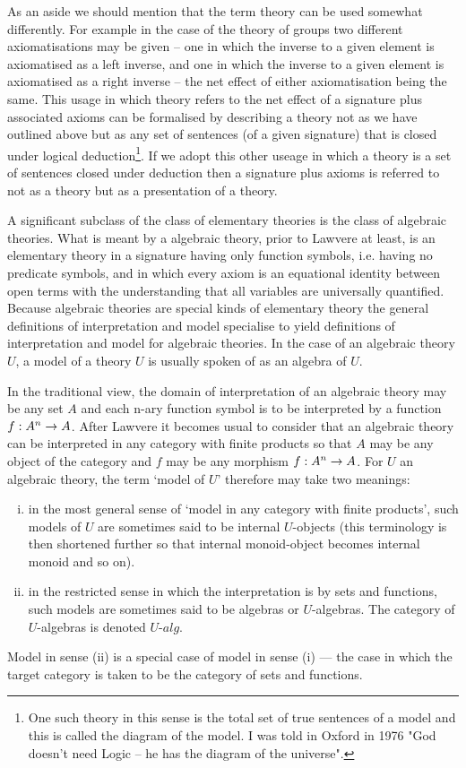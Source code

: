 As an aside we should mention that the term theory can be used somewhat differently. 
For example in the case of the theory of groups two different axiomatisations may be given 
-- one in which the inverse to a given element is axiomatised as a left inverse, and one in which the inverse to a given element is axiomatised as a right inverse --
the net effect of either axiomatisation being the same.
This usage in which  theory refers to the net effect of a signature plus associated axioms
can be formalised by describing a 
theory not as we have outlined above but as any set of sentences
 (of a given signature) that is closed under logical deduction\footnote{One such theory in this sense is the total set of true sentences of a model and  
this is called the diagram of the model. I was told in Oxford in 1976 "God doesn't need Logic -- he has the diagram of the universe".}. 
If we adopt this other useage in which a theory is a set of sentences closed under deduction then a signature plus axioms is referred to not as a theory but as a presentation of a theory. 

A significant subclass of the class of elementary theories is the class of algebraic theories. 
What is meant by a algebraic theory, prior to Lawvere at least, is an elementary theory in a signature having only function symbols, 
i.e. having no predicate symbols, 
and in which every axiom is an equational identity between open terms with the understanding that
all variables are universally quantified. 
Because algebraic theories are special kinds of elementary theory the general definitions of interpretation and model  specialise to yield definitions of 
interpretation and model for algebraic theories. In the case of an algebraic theory $U$, a model of a theory $U$ is usually spoken of as an algebra of $U$.

In the traditional view, the domain of interpretation of an algebraic theory may be any set $A$ 
and each n-ary function symbol is to be interpreted by a  function $f:A^n \rightarrow A$.
After Lawvere it becomes usual to consider that an algebraic theory can be interpreted in any category with finite products
 so that $A$ may be any object of the category and  $f$ may be any morphism $f:A^n \rightarrow A$. 
For $U$ an algebraic theory, the term `model of $U$' therefore may take two meanings:
\begin{enumerate}[(i)]
\item in the most general sense of `model in any category  with finite products',
 such models of $U$ are sometimes said to be internal $U$-objects (this terminology is then shortened further so that internal monoid-object becomes internal monoid and so on). 
\item in the restricted sense in which the interpretation is by sets and functions, such models are sometimes said to be algebras or
$U$-algebras. The category of $U$-algebras is denoted $U$-$alg$. 
\end{enumerate} 
Model in sense (ii) is a special case of model in sense (i) ---  the case in which the target category is taken to be the category of sets and functions.

